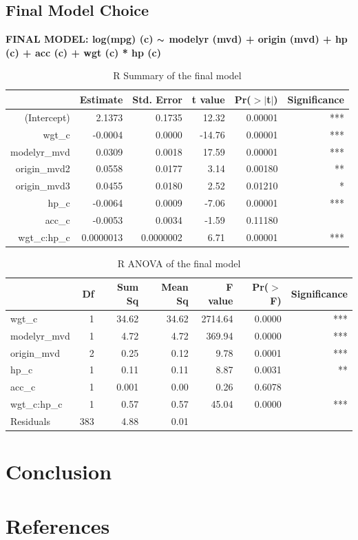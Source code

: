 \documentclass{article}
\newcommand{\mt}[1]{\ensuremath{#1}}
\newcommand{\tl}{\mt{\thicksim} }
\begin{document}
\clearpage
\newpage

\subsection{Final Model Choice}

\textbf{FINAL MODEL: log(mpg) (c) \tl modelyr (mvd) + origin (mvd) + hp (c) + acc (c) + wgt (c) * hp (c)}

\begin{table}[ht]
\centering
\begin{tabular}{rrrrrr}
  \hline
 & Estimate & Std. Error & t value & Pr($>$$|$t$|$) & Significance\\ 
  \hline
(Intercept) & 2.1373 & 0.1735 & 12.32 & 0.00001 & *** \\ 
  wgt\_c & -0.0004 & 0.0000 & -14.76 & 0.00001 & *** \\ 
  modelyr\_mvd & 0.0309 & 0.0018 & 17.59 & 0.00001 & *** \\ 
  origin\_mvd2 & 0.0558 & 0.0177 & 3.14 & 0.00180 & ** \\ 
  origin\_mvd3 & 0.0455 & 0.0180 & 2.52 & 0.01210 & * \\ 
  hp\_c & -0.0064 & 0.0009 & -7.06 & 0.00001 & *** \\ 
  acc\_c & -0.0053 & 0.0034 & -1.59 & 0.11180 & \\ 
  wgt\_c:hp\_c & 0.0000013 & 0.0000002 & 6.71 & 0.00001 & *** \\ 
   \hline
\end{tabular}
\caption{R Summary of the final model}
\label{tab:summaryfinalmodel}
\end{table}

\begin{table}[ht]
\centering
\begin{tabular}{lrrrrrr}
  \hline
 & Df & Sum Sq & Mean Sq & F value & Pr($>$F) & Significance \\ 
  \hline
wgt\_c & 1 & 34.62 & 34.62 & 2714.64 & 0.0000 & *** \\ 
  modelyr\_mvd & 1 & 4.72 & 4.72 & 369.94 & 0.0000 & *** \\ 
  origin\_mvd & 2 & 0.25 & 0.12 & 9.78 & 0.0001 & *** \\ 
  hp\_c & 1 & 0.11 & 0.11 & 8.87 & 0.0031 & ** \\ 
  acc\_c & 1 & 0.001 & 0.00 & 0.26 & 0.6078 & \\ 
  wgt\_c:hp\_c & 1 & 0.57 & 0.57 & 45.04 & 0.0000 & *** \\ 
  Residuals & 383 & 4.88 & 0.01 &  &  & \\ 
   \hline
\end{tabular}
\caption{R ANOVA of the final model}
\label{tab:anovafinalmodel}
\end{table}

\section{Conclusion}

\section{References}
\end{document}
